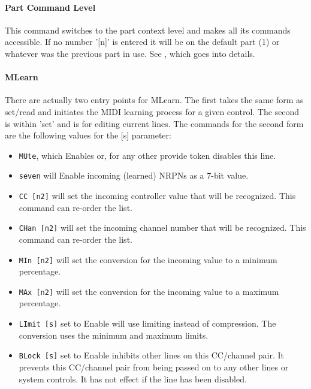 \paragraph{Part Command Level}
\label{paragraph:command_line_context_level_part}

   This command switches to the part context level and makes all its commands
   accessible.  If no number '[n]' is entered it will be on the default part
   (1) or whatever was the previous part in use.
   See , which goes into
   details.

\paragraph{MLearn}
\label{paragraph:command_line_mlearn}
   There are actually two entry points for MLearn. The first takes the same form as set/read and initiates the MIDI learning process for a given control.
   The second is within 'set' and is for editing current lines.
   The commands for the second form are the following values for the [s] parameter:

   \begin{itemize}
      \item \texttt{MUte}, which Enables or, for any other provide token
         disables this line.
      \item \texttt{seven} will Enable incoming (learned) NRPNs as a 7-bit value.
      \item \texttt{CC [n2]} will set the incoming controller value that will
         be recognized.  This command can re-order the list.
      \item \texttt{CHan [n2]} will set the incoming channel number that will
         be recognized.  This command can re-order the list.
      \item \texttt{MIn [n2]} will set the conversion for the incoming
         value to a minimum percentage.
      \item \texttt{MAx [n2]} will set the conversion for the incoming
         value to a maximum percentage.
      \item \texttt{LImit [s]} set to Enable will use limiting instead of
         compression.  The conversion uses the minimum and maximum limits.
      \item \texttt{BLock [s]} set to Enable inhibits other lines on this
         CC/channel pair.  It prevents this CC/channel pair from being passed
         on to any other lines or system controls.  It has not effect if the
         line has been disabled.
   \end{itemize}

